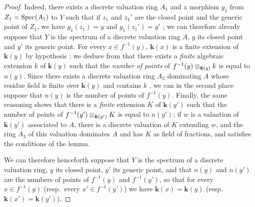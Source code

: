 \begin{proof}
Indeed, there exists a discrete valuation ring $A_1$ and a morphism $g_1$ from $Z_1=\operatorname{Spec}(A_1)$ to $Y$ such that if $z_1$ and $z_1'$ are the closed point and the generic point of $Z_1$,
we have $g_1(z_1)=y$ and $g_1(z_1')=y'$ ; we can therefore already suppose that $Y$ is the spectrum of a discrete valuation ring $A$, $y$ its closed point and $y'$ its generic point.
For every $x\in f^{-1}(y)$, $\boldsymbol{k}(x)$ is a finite extension of $\boldsymbol{k}(y)$ by hypothesis ; we deduce from  that there exists a \emph{finite} algebraic extension $k$ of $\boldsymbol{k}(y)$ such that the \emph{number of points} of $f^{-1}(y)\otimes_{\boldsymbol{k}(y)}k$ is equal to $n(y)$.
Since there exists a discrete valuation ring $A_2$ dominating $A$ whose residue field is finite over $\boldsymbol{k}(y)$ and contains $k$ , we can in the second place suppose that $n(y)$ is the number of points of $f^{-1}(y)$.
Finally, the same reasoning shows that there is a \emph{finite} extension $K$ of $\boldsymbol{k}(y')$ such that the number of points of $f^{-1}(y')\otimes_{\boldsymbol{k}(y')}K$ is equal to $n(y')$; if $w$ is a valuation of $\boldsymbol{k}(y')$ associated to $A$, there is a discrete valuation of $K$ extending $w$, and the ring $A_3$ of this valuation dominates $A$ and has $K$ as field of fractions, and satisfies the conditions of the lemma.

We can therefore henceforth suppose that $Y$ is the spectrum of a discrete valuation ring, $y$ its closed point, $y'$ its generic point, and that $n(y)$ and $n(y')$ are the numbers of points of $f^{-1}(y)$ and $f^{-1}(y')$, so that for every $x\in f^{-1}(y)$ (resp.\ every $x'\in f^{-1}(y')$) we have $\boldsymbol{k}(x)=\boldsymbol{k}(y)$ (resp.\ $\boldsymbol{k}(x')=\boldsymbol{k}(y')$).


\end{proof}
